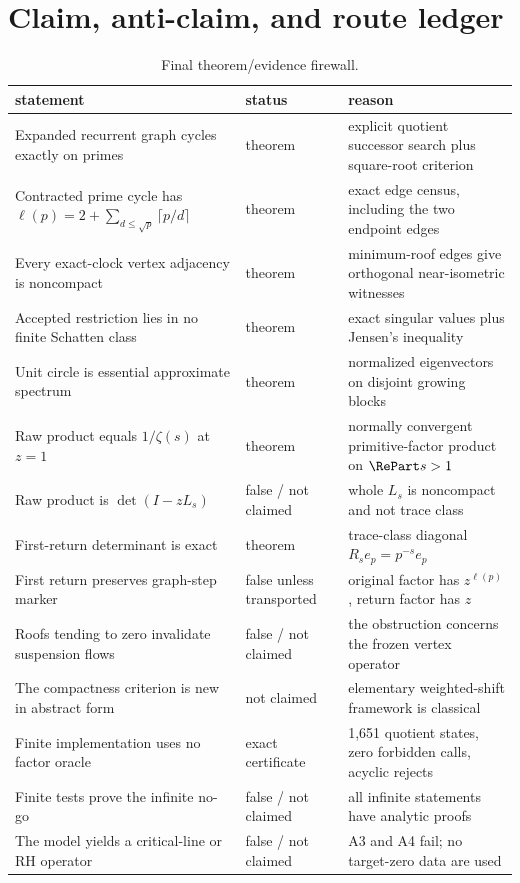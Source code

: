 \section{Claim, anti-claim, and route ledger}
\label{app:ledger}

\begin{table}[ht]
\centering
\small
\caption{Final theorem/evidence firewall.}
\begin{tabularx}{\textwidth}{L{0.31\textwidth}L{0.18\textwidth}X}
\toprule
statement & status & reason \\
\midrule
Expanded recurrent graph cycles exactly on primes & theorem & explicit quotient successor search plus square-root criterion \\
Contracted prime cycle has
$\ell(p)=2+\sum_{d\le\sqrt p}\lceil p/d\rceil$ & theorem & exact edge census, including the two endpoint edges \\
Every exact-clock vertex adjacency is noncompact & theorem & minimum-roof edges give orthogonal near-isometric witnesses \\
Accepted restriction lies in no finite Schatten class & theorem & exact singular values plus Jensen's inequality \\
Unit circle is essential approximate spectrum & theorem & normalized eigenvectors on disjoint growing blocks \\
Raw product equals $1/\zeta(s)$ at $z=1$ & theorem & normally convergent primitive-factor product on $\RePart s>1$ \\
Raw product is $\det(I-zL_s)$ & false / not claimed & whole $L_s$ is noncompact and not trace class \\
First-return determinant is exact & theorem & trace-class diagonal $R_se_p=p^{-s}e_p$ \\
First return preserves graph-step marker & false unless transported & original factor has $z^{\ell(p)}$, return factor has $z$ \\
Roofs tending to zero invalidate suspension flows & false / not claimed & the obstruction concerns the frozen vertex operator \\
The compactness criterion is new in abstract form & not claimed & elementary weighted-shift framework is classical \\
Finite implementation uses no factor oracle & exact certificate & 1,651 quotient states, zero forbidden calls, acyclic rejects \\
Finite tests prove the infinite no-go & false / not claimed & all infinite statements have analytic proofs \\
The model yields a critical-line or RH operator & false / not claimed & A3 and A4 fail; no target-zero data are used \\
\bottomrule
\end{tabularx}
\end{table}

